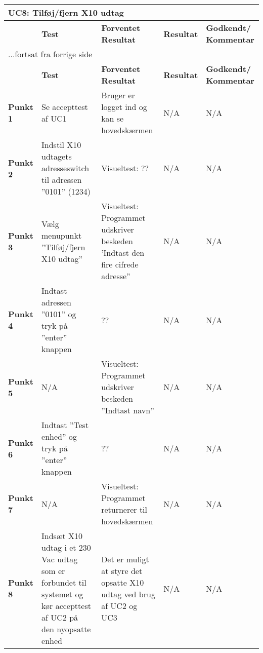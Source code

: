 
\begin{center}
\begin{longtable}{|p{}|p{}|p{3cm}|p{3cm}|p{3cm}|} %
\hline
\multicolumn{5}{|l|}{\textbf{UC8: Tilføj/fjern X10 udtag}} \\ \hline
\multicolumn{1}{|c|}{} &
\textbf{Test} &
\textbf{Forventet \newline Resultat} &
\textbf{Resultat} &
\textbf{Godkendt/ \newline Kommentar} \\ \hline 
\endfirsthead

\multicolumn{5}{l}{...fortsat fra forrige side} \\ \hline 
\multicolumn{1}{|c|}{} &
\textbf{Test} &
\textbf{Forventet \newline Resultat} &
\textbf{Resultat} &
\textbf{Godkendt/ \newline Kommentar} \\ \hline 
\endhead


\textbf{Punkt 1} &
Se accepttest af UC1 &
Bruger er logget ind og kan se hovedskærmen &
N/A &
N/A \\\hline

\textbf{Punkt 2} &
Indstil X10 udtagets adresseswitch til adressen ''0101'' (1234) &
Visueltest: ?? &
N/A &
N/A \\\hline

\textbf{Punkt 3} &
Vælg menupunkt ''Tilføj/fjern X10 udtag'' &
Visueltest: Programmet udskriver beskeden 'Indtast den fire cifrede adresse'' &
N/A &
N/A \\\hline

\textbf{Punkt 4} &
Indtast adressen ''0101'' og tryk på ''enter'' knappen &
?? &
N/A &
N/A \\\hline

\textbf{Punkt 5} &
N/A &
Visueltest: Programmet udskriver beskeden ''Indtast navn''&
N/A &
N/A \\\hline

\textbf{Punkt 6} &
Indtast ''Test enhed'' og tryk på ''enter'' knappen &
??  &
N/A &
N/A \\\hline

\textbf{Punkt 7} &
N/A &
Visueltest: Programmet returnerer til hovedskærmen &
N/A &
N/A \\\hline

\textbf{Punkt 8} &
Indsæt X10 udtag i et 230 Vac udtag som er forbundet til systemet og kør accepttest af UC2 på den nyopsatte enhed&
Det er muligt at styre det opsatte X10 udtag ved brug af UC2 og UC3&
N/A &
N/A \\\hline


	\end{longtable}
	\label{ATUC8} 
\end{center}